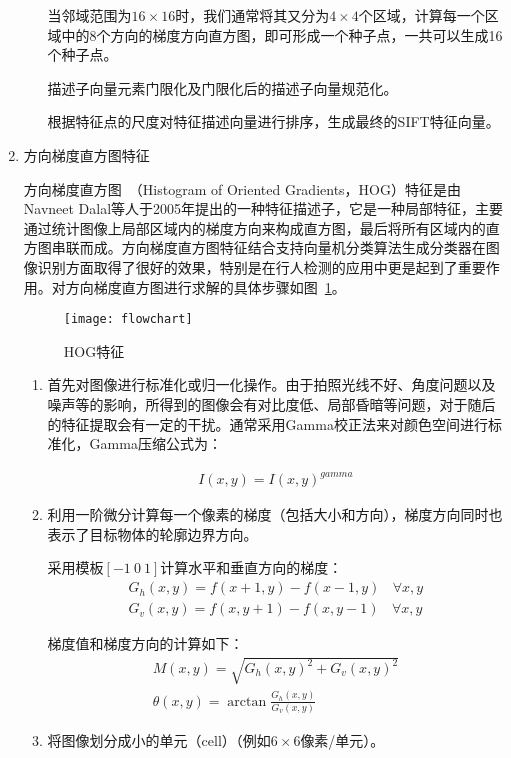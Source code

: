 \begin{enumerate}
\begin{enumerate}
当邻域范围为$16\times16$时，我们通常将其又分为$4 \times 4$个区域，计算每一个区域中的8个方向的梯度方向直方图，即可形成一个种子点，一共可以生成16个种子点。

描述子向量元素门限化及门限化后的描述子向量规范化。

根据特征点的尺度对特征描述向量进行排序，生成最终的SIFT特征向量。
\end{enumerate}

\item 方向梯度直方图特征

方向梯度直方图~\cite{dalal2005histograms}（Histogram of Oriented Gradients，HOG）特征是由Navneet Dalal等人于2005年提出的一种特征描述子，它是一种局部特征，主要通过统计图像上局部区域内的梯度方向来构成直方图，最后将所有区域内的直方图串联而成。方向梯度直方图特征结合支持向量机分类算法生成分类器在图像识别方面取得了很好的效果，特别是在行人检测的应用中更是起到了重要作用。对方向梯度直方图进行求解的具体步骤如图~\ref{fig: shixian}。
\begin{figure}
\centering
\texttt{[image: flowchart]}
\caption{HOG特征}
\label{fig: shixian}
\end{figure}

\begin{enumerate}
\item 首先对图像进行标准化或归一化操作。由于拍照光线不好、角度问题以及噪声等的影响，所得到的图像会有对比度低、局部昏暗等问题，对于随后的特征提取会有一定的干扰。通常采用Gamma校正法来对颜色空间进行标准化，Gamma压缩公式为：

\begin{align}
I(x,y)=I(x,y)^{gamma}
\end{align}

\item 利用一阶微分计算每一个像素的梯度（包括大小和方向），梯度方向同时也表示了目标物体的轮廓边界方向。
    
采用模板$[-1~0~1]$计算水平和垂直方向的梯度：
\begin{align}
G_{h}(x,y)=f(x+1,y)-f(x-1,y)~~~~\forall x,y\\
G_{v}(x,y)=f(x,y+1)-f(x,y-1)~~~~\forall x,y
\end{align}
        
梯度值和梯度方向的计算如下：
\begin{align}
M(x,y)=\sqrt{G_{h}(x,y)^{2}+G_{v}(x,y)^2}\\
\theta(x,y)=\arctan\frac{G_{h}(x,y)}{G_{v}(x,y)}
\end{align}
        
\item 将图像划分成小的单元（cell）（例如$6 \times 6$像素/单元）。


\end{enumerate}
\end{enumerate}

